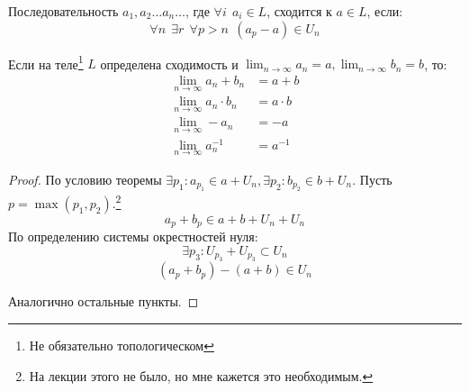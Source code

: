 \begin{definition}
	Последовательность \(a_1, a_2 \ldots a_n \ldots\), где \(\forall i \ \ a_i \in L\),
	сходится к \(a \in L\), если:
	\[\forall n \ \ \exists r \ \ \forall p > n \ \ (a_p - a) \in U_n\]
\end{definition}

\begin{theorem}
	Если на теле\footnote{Не обязательно топологическом} \(L\) определена сходимость и \(\lim_{n \to \infty} a_n = a, \lim_{n \to \infty} b_n = b\), то:
	\begin{align*}
		\lim_{n \to \infty} a_n + b_n     & = a + b     \\
		\lim_{n \to \infty} a_n \cdot b_n & = a \cdot b \\
		\lim_{n \to \infty} -a_n          & = -a        \\
		\lim_{n \to \infty} a_n^{-1}      & = a^{-1}
	\end{align*}
\end{theorem}
\begin{proof}
	По условию теоремы \(\exists p_1 : a_{p_1} \in a + U_n, \exists p_2 : b_{p_2} \in b + U_n\).
	Пусть \(p = \max(p_1, p_2)\).\footnote{На лекции этого не было, но мне кажется это необходимым.}
	\[a_p + b_p \in a + b + U_n + U_n\]
	По определению системы окрестностей нуля:
	\[\exists p_3 : U_{p_3} + U_{p_3} \subset U_n\]
	\[(a_p + b_p) - (a + b) \in U_n\]

	Аналогично остальные пункты.
\end{proof}
